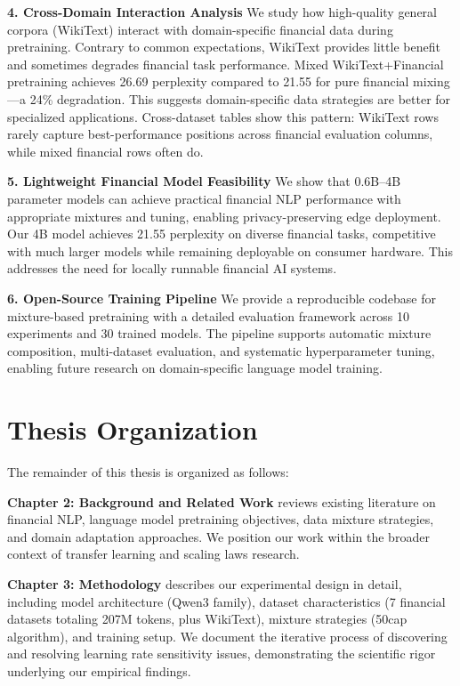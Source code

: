 \textbf{4. Cross-Domain Interaction Analysis}
We study how high-quality general corpora (WikiText) interact with domain-specific financial data during pretraining. Contrary to common expectations, WikiText provides little benefit and sometimes degrades financial task performance. Mixed WikiText+Financial pretraining achieves 26.69 perplexity compared to 21.55 for pure financial mixing—a 24\% degradation. This suggests domain-specific data strategies are better for specialized applications. Cross-dataset tables show this pattern: WikiText rows rarely capture best-performance positions across financial evaluation columns, while mixed financial rows often do.

\textbf{5. Lightweight Financial Model Feasibility}
We show that 0.6B–4B parameter models can achieve practical financial NLP performance with appropriate mixtures and tuning, enabling privacy-preserving edge deployment. Our 4B model achieves 21.55 perplexity on diverse financial tasks, competitive with much larger models while remaining deployable on consumer hardware. This addresses the need for locally runnable financial AI systems.

\textbf{6. Open-Source Training Pipeline}
We provide a reproducible codebase for mixture-based pretraining with a detailed evaluation framework across 10 experiments and 30 trained models. The pipeline supports automatic mixture composition, multi-dataset evaluation, and systematic hyperparameter tuning, enabling future research on domain-specific language model training.

\section{Thesis Organization}

The remainder of this thesis is organized as follows:

\textbf{Chapter 2: Background and Related Work} reviews existing literature on financial NLP, language model pretraining objectives, data mixture strategies, and domain adaptation approaches. We position our work within the broader context of transfer learning and scaling laws research.

\textbf{Chapter 3: Methodology} describes our experimental design in detail, including model architecture (Qwen3 family), dataset characteristics (7 financial datasets totaling 207M tokens, plus WikiText), mixture strategies (50cap algorithm), and training setup. We document the iterative process of discovering and resolving learning rate sensitivity issues, demonstrating the scientific rigor underlying our empirical findings.

